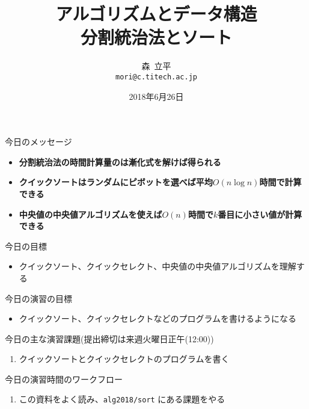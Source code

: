 \documentclass[a4paper,twoside,onecolumn,openany,article,10pt]{memoir}
\title{アルゴリズムとデータ構造\\\vspace{.5em} \Large 分割統治法とソート}
\date{2018年6月26日}
\author{森~立平\\ \texttt{mori@c.titech.ac.jp}}
\theoremstyle{remark}
\begin{document}
\maketitle


\noindent
今日のメッセージ
\begin{itemize}
\item \textbf{分割統治法の時間計算量のは漸化式を解けば得られる}
\item \textbf{クイックソートはランダムにピボットを選べば平均$O(n\log n)$時間で計算できる}
\item \textbf{中央値の中央値アルゴリズムを使えば$O(n)$時間で$k$番目に小さい値が計算できる}
\end{itemize}

\noindent
今日の目標
\begin{itemize}
\item クイックソート、クイックセレクト、中央値の中央値アルゴリズムを理解する
\end{itemize}

\noindent
今日の演習の目標
\begin{itemize}
\item クイックソート、クイックセレクトなどのプログラムを書けるようになる
\end{itemize}

\noindent
今日の主な演習課題(提出締切は来週火曜日正午(12:00))
\begin{enumerate}
\item クイックソートとクイックセレクトのプログラムを書く
\end{enumerate}

\noindent
今日の演習時間のワークフロー
\begin{enumerate}
\item この資料をよく読み、\texttt{alg2018/sort} にある課題をやる
\end{enumerate}
\end{document}
